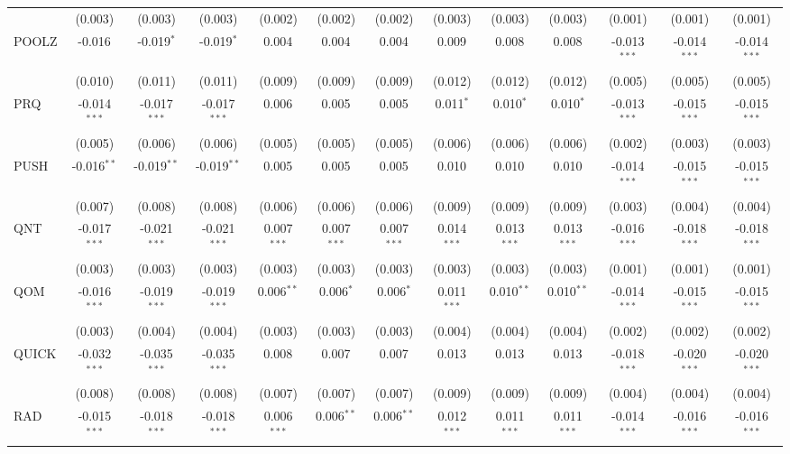 \begin{table}[!htbp]
\begin{tabular}{@{\extracolsep{5pt}}lcccccccccccc}
  & (0.003) & (0.003) & (0.003) & (0.002) & (0.002) & (0.002) & (0.003) & (0.003) & (0.003) & (0.001) & (0.001) & (0.001) \\
 POOLZ & -0.016$^{}$ & -0.019$^{*}$ & -0.019$^{*}$ & 0.004$^{}$ & 0.004$^{}$ & 0.004$^{}$ & 0.009$^{}$ & 0.008$^{}$ & 0.008$^{}$ & -0.013$^{***}$ & -0.014$^{***}$ & -0.014$^{***}$ \\
  & (0.010) & (0.011) & (0.011) & (0.009) & (0.009) & (0.009) & (0.012) & (0.012) & (0.012) & (0.005) & (0.005) & (0.005) \\
 PRQ & -0.014$^{***}$ & -0.017$^{***}$ & -0.017$^{***}$ & 0.006$^{}$ & 0.005$^{}$ & 0.005$^{}$ & 0.011$^{*}$ & 0.010$^{*}$ & 0.010$^{*}$ & -0.013$^{***}$ & -0.015$^{***}$ & -0.015$^{***}$ \\
  & (0.005) & (0.006) & (0.006) & (0.005) & (0.005) & (0.005) & (0.006) & (0.006) & (0.006) & (0.002) & (0.003) & (0.003) \\
 PUSH & -0.016$^{**}$ & -0.019$^{**}$ & -0.019$^{**}$ & 0.005$^{}$ & 0.005$^{}$ & 0.005$^{}$ & 0.010$^{}$ & 0.010$^{}$ & 0.010$^{}$ & -0.014$^{***}$ & -0.015$^{***}$ & -0.015$^{***}$ \\
  & (0.007) & (0.008) & (0.008) & (0.006) & (0.006) & (0.006) & (0.009) & (0.009) & (0.009) & (0.003) & (0.004) & (0.004) \\
 QNT & -0.017$^{***}$ & -0.021$^{***}$ & -0.021$^{***}$ & 0.007$^{***}$ & 0.007$^{***}$ & 0.007$^{***}$ & 0.014$^{***}$ & 0.013$^{***}$ & 0.013$^{***}$ & -0.016$^{***}$ & -0.018$^{***}$ & -0.018$^{***}$ \\
  & (0.003) & (0.003) & (0.003) & (0.003) & (0.003) & (0.003) & (0.003) & (0.003) & (0.003) & (0.001) & (0.001) & (0.001) \\
 QOM & -0.016$^{***}$ & -0.019$^{***}$ & -0.019$^{***}$ & 0.006$^{**}$ & 0.006$^{*}$ & 0.006$^{*}$ & 0.011$^{***}$ & 0.010$^{**}$ & 0.010$^{**}$ & -0.014$^{***}$ & -0.015$^{***}$ & -0.015$^{***}$ \\
  & (0.003) & (0.004) & (0.004) & (0.003) & (0.003) & (0.003) & (0.004) & (0.004) & (0.004) & (0.002) & (0.002) & (0.002) \\
 QUICK & -0.032$^{***}$ & -0.035$^{***}$ & -0.035$^{***}$ & 0.008$^{}$ & 0.007$^{}$ & 0.007$^{}$ & 0.013$^{}$ & 0.013$^{}$ & 0.013$^{}$ & -0.018$^{***}$ & -0.020$^{***}$ & -0.020$^{***}$ \\
  & (0.008) & (0.008) & (0.008) & (0.007) & (0.007) & (0.007) & (0.009) & (0.009) & (0.009) & (0.004) & (0.004) & (0.004) \\
 RAD & -0.015$^{***}$ & -0.018$^{***}$ & -0.018$^{***}$ & 0.006$^{***}$ & 0.006$^{**}$ & 0.006$^{**}$ & 0.012$^{***}$ & 0.011$^{***}$ & 0.011$^{***}$ & -0.014$^{***}$ & -0.016$^{***}$ & -0.016$^{***}$ \\

\end{tabular}
\end{table}

